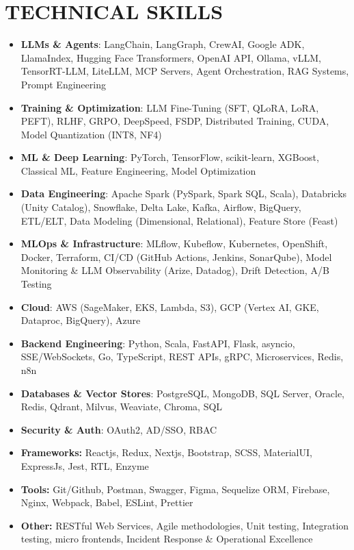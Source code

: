 \documentclass[a4paper]{article}
\begin{document}
\section*{TECHNICAL SKILLS}
\setlength{\arrayrulewidth}{1.2pt}
\begin{itemize}
\item \textbf{LLMs \& Agents}{: LangChain, LangGraph, CrewAI, Google ADK, LlamaIndex, Hugging Face Transformers, OpenAI API, Ollama, vLLM, TensorRT-LLM, LiteLLM, MCP Servers, Agent Orchestration, RAG Systems, Prompt Engineering}
\item \textbf{Training \& Optimization}{: LLM Fine-Tuning (SFT, QLoRA, LoRA, PEFT), RLHF, GRPO, DeepSpeed, FSDP, Distributed Training, CUDA, Model Quantization (INT8, NF4)}
\item \textbf{ML \& Deep Learning}{: PyTorch, TensorFlow, scikit-learn, XGBoost, Classical ML, Feature Engineering, Model Optimization}
\item \textbf{Data Engineering}{: Apache Spark (PySpark, Spark SQL, Scala), Databricks (Unity Catalog), Snowflake, Delta Lake, Kafka, Airflow, BigQuery, ETL/ELT, Data Modeling (Dimensional, Relational), Feature Store (Feast)}
\item \textbf{MLOps \& Infrastructure}{: MLflow, Kubeflow, Kubernetes, OpenShift, Docker, Terraform, CI/CD (GitHub Actions, Jenkins, SonarQube), Model Monitoring \& LLM Observability (Arize, Datadog), Drift Detection, A/B Testing}
\item \textbf{Cloud}{: AWS (SageMaker, EKS, Lambda, S3), GCP (Vertex AI, GKE, Dataproc, BigQuery), Azure}
\item \textbf{Backend Engineering}{: Python, Scala, FastAPI, Flask, asyncio, SSE/WebSockets, Go, TypeScript, REST APIs, gRPC, Microservices, Redis, n8n}
\item \textbf{Databases \& Vector Stores}{: PostgreSQL, MongoDB, SQL Server, Oracle, Redis, Qdrant, Milvus, Weaviate, Chroma, SQL}
\item \textbf{Security \& Auth}{: OAuth2, AD/SSO, RBAC}
\item \textbf{Frameworks:} Reactjs, Redux, Nextjs, Bootstrap, SCSS, MaterialUI, ExpressJs, Jest, RTL, Enzyme
\item \textbf{Tools:} Git/Github, Postman, Swagger, Figma, Sequelize ORM, Firebase, Nginx, Webpack, Babel, ESLint, Prettier
\item \textbf{Other:} RESTful Web Services, Agile methodologies, Unit testing, Integration testing, micro frontends, Incident Response \& Operational Excellence
\end{itemize}
\end{document}
